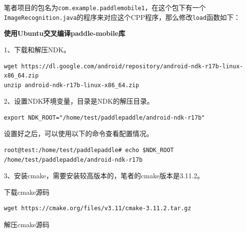 ​
笔者项目的包名为\texttt{com.example.paddlemobile1}，在这个包下有一个\texttt{ImageRecognition.java}的程序来对应这个CPP程序，那么修改\texttt{load}函数如下：

\begin{Shaded}
\begin{Highlighting}[]
  \NormalTok{(}\NormalTok{);}
\NormalTok{;}
   \NormalTok{()->}\NormalTok{(}
\NormalTok{\}}
\end{Highlighting}
\end{Shaded}

\textbf{使用Ubuntu交叉编译paddle-mobile库}

1、下载和解压NDK。

\begin{verbatim}
wget https://dl.google.com/android/repository/android-ndk-r17b-linux-x86_64.zip
unzip android-ndk-r17b-linux-x86_64.zip
\end{verbatim}

2、设置NDK环境变量，目录是NDK的解压目录。

\begin{verbatim}
export NDK_ROOT="/home/test/paddlepaddle/android-ndk-r17b"
\end{verbatim}

设置好之后，可以使用以下的命令查看配置情况。

\begin{verbatim}
root@test:/home/test/paddlepaddle# echo $NDK_ROOT
/home/test/paddlepaddle/android-ndk-r17b
\end{verbatim}

3、安装cmake，需要安装较高版本的，笔者的cmake版本是3.11.2。

下载cmake源码

\begin{verbatim}
wget https://cmake.org/files/v3.11/cmake-3.11.2.tar.gz
\end{verbatim}

解压cmake源码

